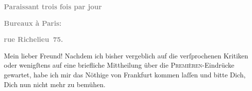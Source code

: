 \pstart
           \begin{otherlanguage}{french}\textcolor{gray}{\textbf{\textbf{Paraissant trois fois par jour}}}\end{otherlanguage}\pend
           
\pstart
           \begin{otherlanguage}{french}\textcolor{gray}{\textbf{\textbf{Bureaux à Paris:}}}\end{otherlanguage}\pend
           
\pstart
           \begin{otherlanguage}{french}\textcolor{gray}{\textbf{\textbf{rue Richelieu 75.}}}\end{otherlanguage}\pend
           
\pstart\center{}Mein lieber Freund!\pend\vspace{0.5em}
\pstart
           Nachdem ich bisher vergeblich auf die verſprochenen Kritiken oder wenigſtens auf eine
               briefliche Mittheilung über die \textsc{Premièren}-Eindrücke
               gewartet, habe ich mir das Nöthige von Frankfurt
               kommen laſſen und bitte Dich, Dich nun nicht mehr zu bemühen.\pend
           
